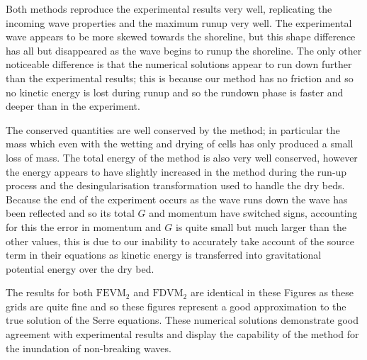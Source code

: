 Both methods reproduce the experimental results very well, replicating the incoming wave properties and the maximum runup very well. The experimental wave appears to be more skewed towards the shoreline, but this shape difference has all but disappeared as the wave begins to runup the shoreline. The only other noticeable difference is that the numerical solutions appear to run down further than the experimental results; this is because our method has no friction and so no kinetic energy is lost during runup and so the rundown phase is faster and deeper than in the experiment.

The conserved quantities are well conserved by the method; in particular the mass which even with the wetting and drying of cells has only produced a small loss of mass. The total energy of the method is also very well conserved, however the energy appears to have slightly increased in the method during the run-up process and the desingularisation transformation used to handle the dry beds. Because the end of the experiment occurs as the wave runs down the wave has been reflected and so its total $G$ and momentum have switched signs, accounting for this the error in momentum and $G$ is quite small but much larger than the other values, this is due to our inability to accurately take account of the source term in their equations as kinetic energy is transferred into gravitational potential energy over the dry bed. 

The results for both $\text{FEVM}_2$ and $\text{FDVM}_2$ are identical in these Figures as these grids are quite fine and so these figures represent a good approximation to the true solution of the Serre equations. These numerical solutions demonstrate good agreement with experimental results and display the capability of the method for the inundation of non-breaking waves.

